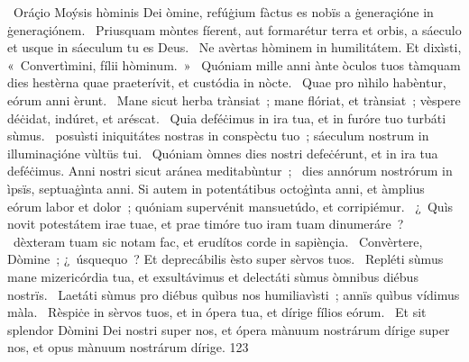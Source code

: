 {~Oráçio Moýsis hòminis Dei}
{%
òmine, refúġium fàctus es nobïs a ġeneraçióne in ġeneraçiónem.
~Priusquam mòntes fíerent, aut formarétur terra et orbis, a sáeculo et usque in sáeculum tu es Deus.
~Ne avèrtas hòminem in humilitátem. Et dixìsti, «~Convertìmini, fílii hòminum.~»
~Quóniam mille anni ànte òculos tuos tàmquam dies hestèrna quae praeterívit, et custódia in nòcte.
~Quae pro nìhilo habèntur, eórum anni èrunt.
~Mane sicut herba trànsiat~; mane flóriat, et trànsiat~; vèspere déċidat, indúret, et aréscat.
~Quia deféċimus in ira tua, et in furóre tuo turbáti sùmus.
~posuìsti iniquitátes nostras in conspèctu tuo~; sáeculum nostrum in illuminaçióne vùltüs tui.
~Quóniam òmnes dies nostri defeċérunt, et in ira tua deféċimus. Anni nostri sicut aránea meditabùntur~;
~dies annórum nostrórum in ìpsïs, septuaġìnta anni. Si autem in potentátibus octoġìnta anni, et àmplius eórum labor et dolor~; quóniam supervénit mansuetúdo, et corripiémur.
~¿~Quìs novit potestátem irae tuae, et prae timóre tuo iram tuam dinumeráre~?
~dèxteram tuam sic notam fac, et erudítos corde in sapiènçia.
~Convèrtere, Dòmine~; ¿~úsquequo~? Et deprecábilis èsto super sèrvos tuos.
~Repléti sùmus mane mizericórdia tua, et exsultávimus et delectáti sùmus òmnibus diébus nostrïs.
~Laetáti sùmus pro diébus quìbus nos humiliavìsti~; annïs quìbus vídimus màla.
~Rèspiċe in sèrvos tuos, et in ópera tua, et dírige fílios eórum.
~Et sit splendor Dòmini Dei nostri super nos, et ópera mànuum nostrárum dírige super nos, et opus mànuum nostrárum dírige.
}
{12}{3}
